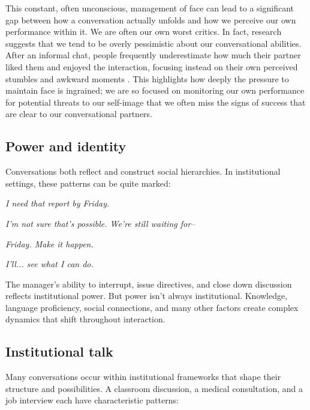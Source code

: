 This constant, often unconscious, management of face can lead to a significant gap between how a conversation actually unfolds and how we perceive our own performance within it. We are often our own worst critics. In fact, research suggests that we tend to be overly pessimistic about our conversational abilities. After an informal chat, people frequently underestimate how much their partner liked them and enjoyed the interaction, focusing instead on their own perceived stumbles and awkward moments \citep{welker2023pessimistic}. This highlights how deeply the pressure to maintain face is ingrained; we are so focused on monitoring our own performance for potential threats to our self-image that we often miss the signs of success that are clear to
our conversational partners.

\subsection{Power and identity} \label{subsec:power}

Conversations both reflect and construct social hierarchies. In institutional settings, these patterns can be quite marked:

\ea
\begin{dialogue}
\item[Manager] \emph{I need that report by Friday.}
\item[Employee] \emph{I'm not sure that's possible. We're still waiting for--}
\item[Manager] \emph{Friday. Make it happen.}
\item[Employee] \emph{I'll... see what I can do.}
\end{dialogue}
\z
The manager's ability to interrupt, issue directives, and close down discussion reflects institutional power. But power isn't always institutional. Knowledge, language proficiency, social connections, and many other factors create complex dynamics that shift throughout interaction.

\subsection{Institutional talk} \label{subsec:institutional}

Many conversations occur within institutional frameworks that shape their structure and possibilities. A classroom discussion, a medical consultation, and a job interview each have characteristic patterns:

